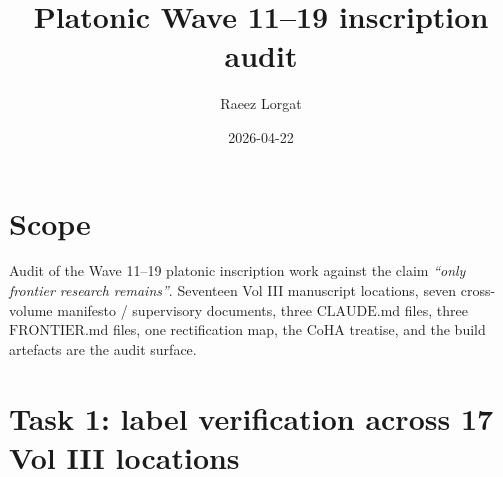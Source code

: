 \documentclass[11pt]{article}
\title{Platonic Wave 11--19 inscription audit}
\author{Raeez Lorgat}
\date{2026-04-22}
\begin{document}
\maketitle

\section{Scope}

Audit of the Wave 11--19 platonic inscription work against the
claim \emph{``only frontier research remains''}. Seventeen Vol III
manuscript locations, seven cross-volume manifesto / supervisory
documents, three $\mathrm{CLAUDE.md}$ files, three $\mathrm{FRONTIER.md}$
files, one rectification map, the $\mathrm{CoHA}$ treatise, and the
build artefacts are the audit surface.

\section{Task 1: label verification across 17 Vol III locations}
\end{document}
